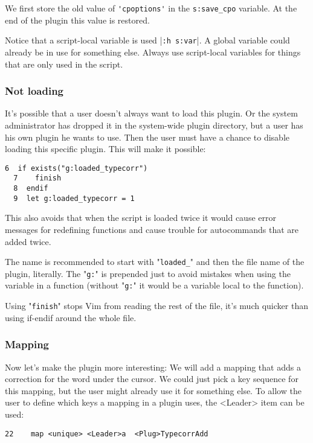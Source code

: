 We first store the old value of \verb!'cpoptions'! in the \verb!s:save_cpo! variable.
At the end of the plugin this value is restored.

Notice that a script-local variable is used |\verb!:h s:var!|.
A global variable could already be in use for something else.
Always use script-local variables for things that are only used in the script.

\subsubsection{Not loading}
It's possible that a user doesn't always want to load this plugin.
Or the system administrator has dropped it in the system-wide plugin directory, but a user has his own plugin he wants to use.
Then the user must have a chance to disable loading this specific plugin.
This will make it possible:

\begin{Verbatim}[samepage=true]
  6  if exists("g:loaded_typecorr")
  7    finish
  8  endif
  9  let g:loaded_typecorr = 1
\end{Verbatim}

This also avoids that when the script is loaded twice it would cause error messages for redefining functions and cause trouble for autocommands that are added twice.

The name is recommended to start with "\verb!loaded_!" and then the file name of the plugin, literally.
The "\verb!g:!" is prepended just to avoid mistakes when using the variable in a function (without "\verb!g:!" it would be a variable local to the function).

Using "\verb!finish!" stops Vim from reading the rest of the file, it's much quicker than using if-endif around the whole file.

\subsubsection{Mapping}
Now let's make the plugin more interesting: We will add a mapping that adds a correction for the word under the cursor.
We could just pick a key sequence for this mapping, but the user might already use it for something else.
To allow the user to define which keys a mapping in a plugin uses, the <Leader> item can be used:

\begin{Verbatim}[samepage=true]
 22    map <unique> <Leader>a  <Plug>TypecorrAdd
\end{Verbatim}

